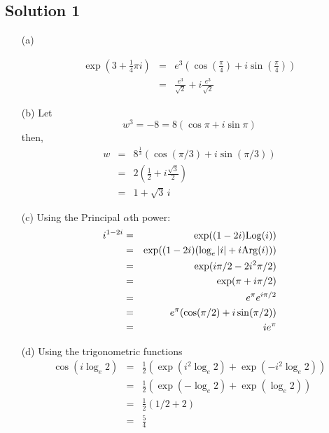 \subsection*{Solution 1}

\begin{itemize}
\item[(a)]

\begin{eqnarray*}
\exp(3+\frac{1}{4}\pi i)
	&=& e^3 \left( \cos \left(\frac{\pi}{4}\right) + i \sin \left(\frac{\pi}{4}\right) \right) \\
	&=& \frac{e^3}{\sqrt{2}} + i\frac{e^3}{\sqrt{2}}
\end{eqnarray*}

\item[(b)]
Let
\[ w^3 = -8 = 8( \cos\pi + i\sin\pi ) \]
then, 
\begin{eqnarray*}
w	&=& 8^\frac{1}{3} ( \cos ( \pi/3 ) + i \sin ( \pi/3 ) ) \\
	&=& 2 \left( \frac{1}{2} + i \frac{\sqrt{3}}{2} \right) \\
	&=& 1 + \sqrt{3}\,i
\end{eqnarray*}

\item[(c)]
Using the Principal $\alpha$th power:
\begin{eqnarray*}
i^{1-2i}
	&=& \exp( (1-2i) {\rm Log}(i)) \\
	&=& \exp( (1-2i) (\log_e|i| + i{\rm Arg}(i) ) ) \\
	&=& \exp( i\pi/2 - 2i^2\pi/2 ) \\
	&=& \exp( \pi + i\pi/2 ) \\
	&=& e^\pi e^{i\pi/2} \\
	&=& e^\pi ( \cos(\pi/2) + i\sin(\pi/2) ) \\
	&=& ie^\pi
\end{eqnarray*}

\item[(d)]
Using the trigonometric functions
\begin{eqnarray*}
\cos(i\log_e 2)
	&=& \frac{1}{2} \left( \exp(i^2\log_e 2) + \exp(-i^2\log_e 2) \right) \\
	&=& \frac{1}{2} \left( \exp(-\log_e 2) + \exp(\log_e 2) \right) \\
	&=& \frac{1}{2} \left( 1/2 + 2 \right) \\
	&=& \frac{5}{4}
\end{eqnarray*}

\end{itemize}

